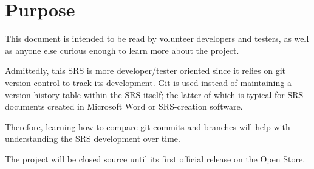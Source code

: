 \section{Purpose}

This document is intended to be read by volunteer developers and testers, as well as anyone else curious enough to learn more about the project.

Admittedly, this SRS is more developer/tester oriented since it relies on git version control to track its development. Git is  used instead of maintaining a version history table within the SRS itself; the latter of which is typical for SRS documents created in Microsoft Word or SRS-creation software.

Therefore, learning how to compare git commits and branches will help with understanding the SRS development over time. 

The project will be closed source until its first official release on the Open Store.